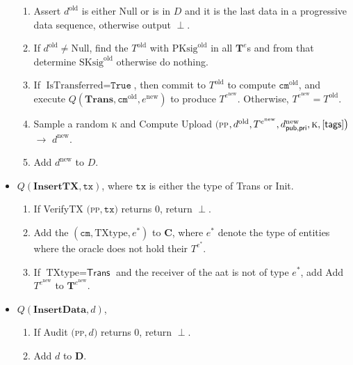 \begin{itemize}
	\begin{enumerate}
		\item Assert $d^\text{old}$ is either Null or is in $D$ and it is the last data in a progressive data sequence, otherwise output $\perp$.
		\item If  $d^\text{old} \neq \text{Null}$, find the $T^\text{old}$ with $\text{PKsig}^\text{old}$ in all $\mathbf{T}^e$s and from that determine  $\text{SKsig}^\text{old}$ otherwise do nothing.
		\item \sloppy If $\text{IsTransferred} = \texttt{True}$, then commit to $T^\text{old}$ to compute $\texttt{cm}^\text{old}$, and execute  $Q(\textbf{Trans}, \texttt{cm}^\text{old}, e^\text{new})$ to produce $T^{e^\text{new}}$. Otherwise, $T^{e^\text{new}} = T^\text{old}$.
		\item Sample a random \textsc{k} and Compute \textsf{Upload} $\big($\textsc{pp}$, d^\text{old}, T^{e^\text{new}}, d^\text{new}_{\mathsf{pub}, \mathsf{pri}}, \textsc{k}, [\textsf{tags}]  \big)$ $\rightarrow$ $d^\text{new}$.
		\item Add $d^\text{new}$ to $D$.
	\end{enumerate}
	
	\item $Q(\textbf{InsertTX}, \texttt{tx})$, where $\texttt{tx}$ is either the type of \textsf{Trans} or  \textsf{Init}.
	\begin{enumerate}
		\item If \textsf{VerifyTX} $\big($\textsc{pp}$, \texttt{tx} \big)$  returns 0, return $\perp$.
		\item Add the $(\texttt{cm}, \text{TXtype}, e^*)$ to  $\mathbf{C}$, where $e^*$ denote the type of entities where the oracle does not hold their $T^{e^*}$.
		\item If $ \text{TXtype} = \textsf{Trans}$ and the receiver of the \gls{aat} is not of type $e^*$, add   Add $T^{e^\text{new}}$ to $\mathbf{T}^{e^{\text{new}}}$.
	\end{enumerate}
	
		\item $Q(\textbf{InsertData}, d)$, 
	\begin{enumerate}
		\item If \textsf{Audit} $\big($\textsc{pp}$, d \big)$  returns 0, return $\perp$.
		\item Add $d$ to  $\mathbf{D}$.
	\end{enumerate}
\end{itemize}

